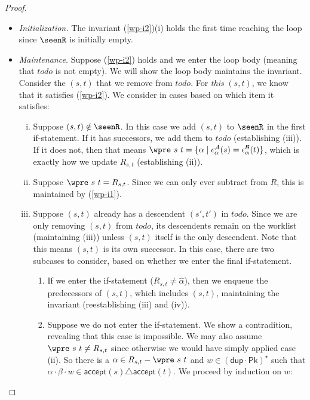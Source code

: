 \documentclass[acmsmall,dvipsnames,nonacm]{acmart}
\newcommand\todoR{\textit{todo}}
\newcommand\Pk{\mathsf{Pk}}
\newcommand\sympk{\widehat\alpha}
\newcommand\pk{\alpha}
\newcommand\pkp{\beta}
\newcommand\dup{\mathsf{dup}}
\newcommand\accept{\mathsf{accept}}
\newcommand\A{\mathcal{A}}
\newcommand\B{\mathcal{B}}
\newcommand\epsA{\epsilon^\A_\pk}
\newcommand\epsB{\epsilon^\B_\pk}
\begin{document}
\begin{proof}
\begin{itemize}
    \item \emph{Initialization.} The invariant (\ref{wp-i2})(i) holds the first
    time reaching the loop since $\seenR$ is initially empty.
    \item \emph{Maintenance.} Suppose (\ref{wp-i2}) holds and we enter the loop
    body (meaning that $\todoR$ is not empty). We will show the loop body
    maintains the invariant.  Consider the $(s,t)$ that we remove from $\todoR$.
    For \emph{this} $(s,t)$, we know that it satisfies (\ref{wp-i2}). We
    consider in cases based on which item it satisfies:
    \begin{enumerate}[(i)]
        \item Suppose $(s,t)\notin\seenR$. In this case we add $(s,t)$ to $\seenR$ in the
        first if-statement. If it has successors, we add them to $\todoR$
        (establishing (iii)). If it does not, then that means
        $\wpre\ s\ t = \{ \pk \mid \epsA(s) = \epsB(t) \}$, which is exactly
        how we update $R_{s,t}$ (establishing (ii)).
%
        \item Suppose $\wpre\ s\ t = R_{s,t}$. Since we can only
        ever subtract from $R$, this is maintained by (\ref{wp-i1}).
%
        \item Suppose $(s,t)$ already has a descendent $(s',t')$ in $\todoR$. Since we are
            only removing $(s,t)$ from $\todoR$, its descendents remain on the
            worklist (maintaining (iii)) unless $(s,t)$ itself is the only
            descendent. Note that this means $(s,t)$ is its own successor. In
            this case, there are two subcases to consider, based on whether we
            enter the final if-statement.
        \begin{enumerate}
            \item If we enter the if-statement ($R_{s,t} \neq \sympk$), then we
            enqueue the predecessors of $(s,t)$, which includes $(s,t)$, maintaining
            the invariant (reestablishing (iii) and (iv)).
            \item Suppose we do not enter the if-statement. We show a
            contradition, revealing that this case is impossible. We may also assume
            $\wpre\ s\ t \neq R_{s,t}$ since otherwise we would have simply
            applied case (ii).
            So there is a $\pk\in R_{s,t} - \wpre\ s\ t$ and $w\in
            (\dup\cdot \Pk)^\star$ such that
            $\pk\cdot \pkp\cdot w \in \accept(s)\triangle\accept(t)$. We proceed
            by induction on $w$:

\end{enumerate}
\end{enumerate}
\end{itemize}
\end{proof}
\end{document}
